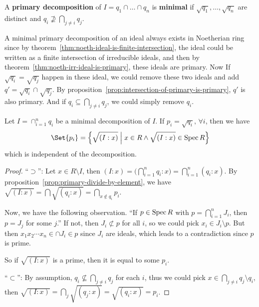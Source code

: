 \begin{definition}
  A {\bf primary decomposition} of $I = q_1 \cap \dots \cap q_n$ is {\bf minimal} if $\sqrt{q_1}, \dots, \sqrt{q_n}$
  are distinct and $q_i \not\supseteq \bigcap_{j \neq i} q_j$.
\end{definition}

A minimal primary decomposition of an ideal always exists in Noetherian ring since by
theorem~\ref{thm:noeth-ideal-is-finite-intersection}, the ideal could be written
as a finite intersection of irreducible ideals, and then by theorem~\ref{thm:noeth-irr-ideal-is-primary},
these ideals are primary. Now If $\sqrt{q_i} = \sqrt{q_j}$ happen in these ideal,
we could remove these two ideals and add $q' = \sqrt{q_i} \cap \sqrt{q_j}$.
By proposition~\ref{prop:intersection-of-primary-is-primary}, $q'$ is also primary.
And if $q_i \subseteq \bigcap_{j \neq i} q_j$, we could simply remove $q_i$.

\medskip

\begin{theorem}
  Let $I = \cap_{i = 1}^n q_i$ be a minimal decomposition of $I$.
  If $p_i = \sqrt{q_i}, \, \forall i$, then we have
  \[ \Set{p_i} = \Big\{ \sqrt{(I: x)} \Bigm| x \in R \land \sqrt{(I: x)} \in \Spec R \Big\} \]
  which is independent of the decomposition.

  \begin{proof}
    ``$\supset$'': Let $x \in R \setminus I$, then $(I: x) = \big( \bigcap_{i=1}^n q_i : x \big)
    = \bigcap_{i = 1}^n (q_i: x)$. By proposition~\ref{prop:primary-divide-by-element},
    we have $\sqrt{(I: x)} = \bigcap \sqrt{(q_i: x)} = \bigcap_{x \not\in q_i} p_i$.

    Now, we have the following observation. ``If $p \in \operatorname{Spec} R$ with $p = \bigcap_{i=1}^n J_i$,
    then $p = J_j$ for some $j$.'' If not, then $J_i \not\subset p$ for all $i$,
    so we could pick $x_i \in J_i \setminus p$.
    But then $x_1 x_2 \dotsm x_n \in \cap J_i \in p$ since $J_i$ are ideals,
    which leads to a contradiction since $p$ is prime.

    So if $\sqrt{(I: x)}$ is a prime, then it is equal to some $p_i$.

    ``$\subset$'': By assumption, $q_i \not\subseteq \bigcap_{j \neq i} q_j$ for each $i$,
    thus we could pick $x \in \bigcap_{j \neq i} q_j \setminus q_i$,
    then $\sqrt{(I: x)} = \bigcap_j \sqrt{(q_j: x)} = \sqrt{(q_i: x)} = p_i$.
  \end{proof}
\end{theorem}


